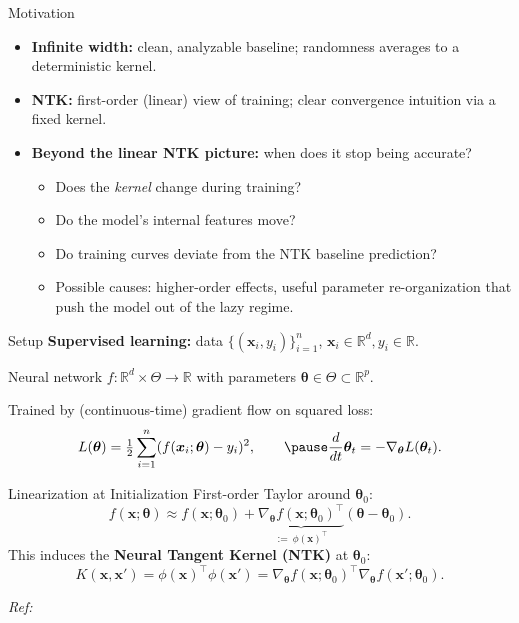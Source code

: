 \documentclass[10pt,aspectratio=169]{beamer}
\newcommand{\R}{\mathbb{R}}
\newcommand{\btheta}{\boldsymbol{\theta}}
\newcommand{\bx}{\boldsymbol{x}}
\begin{document}

\begin{frame}{Motivation}
	\begin{itemize}
		\item \textbf{Infinite width:} clean, analyzable baseline; randomness averages to a deterministic kernel.
		      \pause
		\item \textbf{NTK:} first-order (linear) view of training; clear convergence intuition via a fixed kernel.
		      \pause
		\item \textbf{Beyond the linear NTK picture:} when does it stop being accurate?
		      \begin{itemize}
			      \item Does the \emph{kernel} change during training?
			            \pause
			      \item Do the model’s internal features move?
			            \pause
			      \item Do training curves deviate from the NTK baseline prediction?
			            \pause
			      \item Possible causes: higher-order effects, useful parameter
			            re-organization that push the model out of the lazy regime.
		      \end{itemize}
	\end{itemize}
\end{frame}

\begin{frame}{Setup}
	\textbf{Supervised learning:} data $\{(\bx_i,y_i)\}_{i=1}^n$, $\bx_i\in\R^d, y_i\in\R$.

	\pause
	Neural network $f:\R^d\times\Theta\to\R$ with parameters $\btheta\in \Theta \subset \R^p$.
	\pause

	Trained by (continuous-time) gradient flow on squared loss:
	\[
		L(\btheta)=\tfrac{1}{2}\sum_{i=1}^n (f(\bx_i;\btheta)-y_i)^2,
		\qquad
		\pause
		\frac{d}{dt}\btheta_t=-\nabla_{\btheta} L(\btheta_t).
	\]
\end{frame}

\begin{frame}{Linearization at Initialization}
	First-order Taylor around $\btheta_0$:
	\[
		f(\bx;\btheta)\approx f(\bx;\btheta_0)+\underbrace{\nabla_{\btheta} f(\bx;\btheta_0)^{\top}}_{:=~\phi(\bx)^{\top}}(\btheta-\btheta_0).
	\]
	\pause
	This induces the \textbf{Neural Tangent Kernel (NTK)} at $\btheta_0$:
	\[
		K(\bx,\bx')=\phi(\bx)^{\top}\phi(\bx')=\nabla_{\btheta} f(\bx;\btheta_0)^{\top}\nabla_{\btheta} f(\bx';\btheta_0).
	\]

	\vspace{0.4em}
	\footnotesize \emph{Ref:} \citep{jacot2018ntk}\normalsize
\end{frame}
\end{document}
